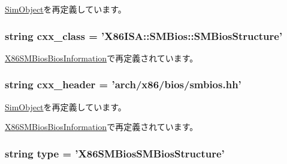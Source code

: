 \hyperlink{classm5_1_1SimObject_1_1SimObject_a17fa61ac3806b481cafee5593b55e5d0}{SimObject}を再定義しています。\hypertarget{classSMBios_1_1X86SMBiosSMBiosStructure_a58cd55cd4023648e138237cfc0822ae3}{
\subsubsection[{cxx\_\-class}]{\setlength{\rightskip}{0pt plus 5cm}string {\bf cxx\_\-class} = '{\bf X86ISA::SMBios::SMBiosStructure}'}}
\label{classSMBios_1_1X86SMBiosSMBiosStructure_a58cd55cd4023648e138237cfc0822ae3}


\hyperlink{classSMBios_1_1X86SMBiosBiosInformation_a58cd55cd4023648e138237cfc0822ae3}{X86SMBiosBiosInformation}で再定義されています。\hypertarget{classSMBios_1_1X86SMBiosSMBiosStructure_a17da7064bc5c518791f0c891eff05fda}{
\subsubsection[{cxx\_\-header}]{\setlength{\rightskip}{0pt plus 5cm}string {\bf cxx\_\-header} = 'arch/x86/bios/smbios.hh'}}
\label{classSMBios_1_1X86SMBiosSMBiosStructure_a17da7064bc5c518791f0c891eff05fda}


\hyperlink{classm5_1_1SimObject_1_1SimObject_a17da7064bc5c518791f0c891eff05fda}{SimObject}を再定義しています。

\hyperlink{classSMBios_1_1X86SMBiosBiosInformation_a17da7064bc5c518791f0c891eff05fda}{X86SMBiosBiosInformation}で再定義されています。\hypertarget{classSMBios_1_1X86SMBiosSMBiosStructure_acce15679d830831b0bbe8ebc2a60b2ca}{
\subsubsection[{type}]{\setlength{\rightskip}{0pt plus 5cm}string {\bf type} = '{\bf X86SMBiosSMBiosStructure}'}}
\label{classSMBios_1_1X86SMBiosSMBiosStructure_acce15679d830831b0bbe8ebc2a60b2ca}


